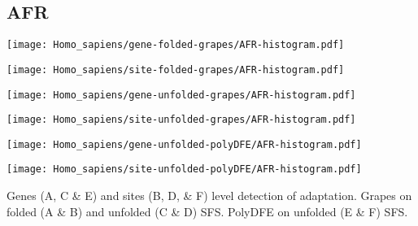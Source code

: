 \documentclass{article}
\begin{document}
\subsection{AFR}
\centering
\begin{minipage}{0.49\linewidth}
    \texttt{[image: Homo\_sapiens/gene-folded-grapes/AFR-histogram.pdf]}
\end{minipage}%
\hfill
\begin{minipage}{0.49\linewidth}
    \texttt{[image: Homo\_sapiens/site-folded-grapes/AFR-histogram.pdf]}
\end{minipage}
\hfill
\begin{minipage}{0.49\linewidth}
    \texttt{[image: Homo\_sapiens/gene-unfolded-grapes/AFR-histogram.pdf]}
\end{minipage}%
\hfill
\begin{minipage}{0.49\linewidth}
    \texttt{[image: Homo\_sapiens/site-unfolded-grapes/AFR-histogram.pdf]}
\end{minipage}
\hfill
\begin{minipage}{0.49\linewidth}
    \texttt{[image: Homo\_sapiens/gene-unfolded-polyDFE/AFR-histogram.pdf]}
\end{minipage}%
\hfill
\begin{minipage}{0.49\linewidth}
    \texttt{[image: Homo\_sapiens/site-unfolded-polyDFE/AFR-histogram.pdf]}
\end{minipage}
\hfill
\flushleft
Genes (A, C \& E) and sites (B, D, \& F) level detection of adaptation.
Grapes on folded (A \& B) and unfolded (C \& D) SFS.
PolyDFE on unfolded (E \& F) SFS.

\pagebreak
\end{document}
